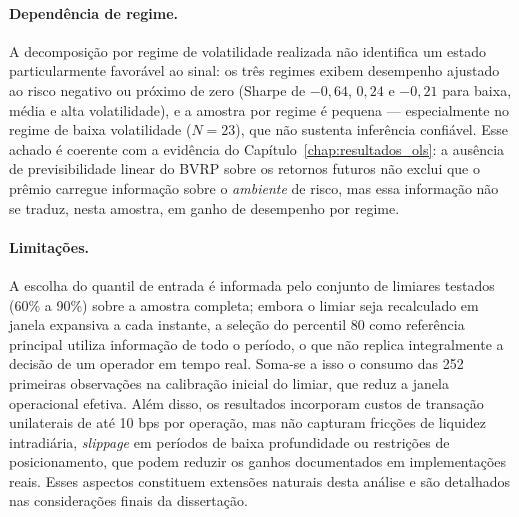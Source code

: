 \paragraph{Dependência de regime.} A decomposição por regime de volatilidade
realizada não identifica um estado particularmente favorável ao sinal: os três
regimes exibem desempenho ajustado ao risco negativo ou próximo de zero (Sharpe
de $-0{,}64$, $0{,}24$ e $-0{,}21$ para baixa, média e alta volatilidade), e a
amostra por regime é pequena --- especialmente no regime de baixa volatilidade
($N = 23$), que não sustenta inferência confiável. Esse achado é coerente com a
evidência do Capítulo~\ref{chap:resultados_ols}: a ausência de previsibilidade
linear do BVRP sobre os retornos futuros não exclui que o prêmio carregue
informação sobre o \emph{ambiente} de risco, mas essa informação não se traduz,
nesta amostra, em ganho de desempenho por regime.

\paragraph{Limitações.} A escolha do quantil de entrada é informada pelo conjunto de limiares testados (60\% a 90\%) sobre a amostra completa; embora o limiar seja recalculado em janela expansiva a cada instante, a seleção do percentil 80 como referência principal utiliza informação de todo o período, o que não replica integralmente a decisão de um operador em tempo real. Soma-se a isso o consumo das 252 primeiras observações na calibração inicial do limiar, que reduz a janela operacional efetiva. Além disso, os resultados incorporam custos de transação unilaterais de até 10 bps por operação, mas não capturam fricções de liquidez intradiária, \emph{slippage} em períodos de baixa profundidade ou restrições de posicionamento, que podem reduzir os ganhos documentados em implementações reais. Esses aspectos constituem extensões naturais desta análise e são detalhados nas considerações finais da dissertação.
